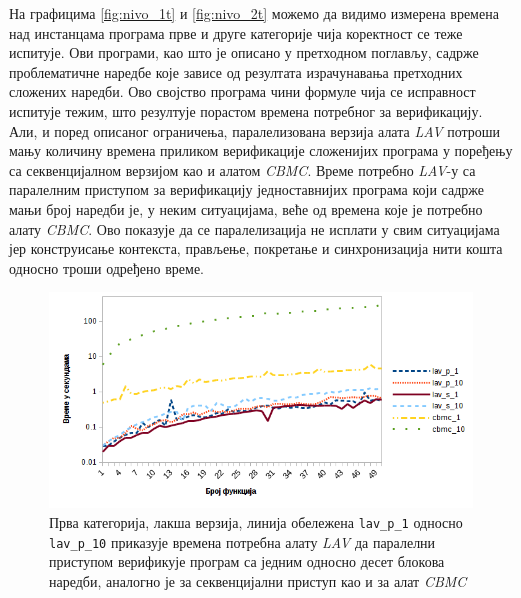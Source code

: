 \documentclass[12pt,oneside]{memoir}
\begin{document}
  На графицима \ref{fig:nivo_1t} и \ref{fig:nivo_2t} можемо да видимо измерена времена над инстанцама програма прве и друге категорије чија коректност се теже испитује. Ови програми, као што је описано у претходном поглављу, садрже проблематичне наредбе које зависе од резултата израчунавања претходних сложених наредби. Ово својство програма чини формуле чија се исправност испитује тежим, што резултује порастом времена потребног за верификацију. Али, и поред описаног ограничења, паралелизована верзија алата \textit{LAV} потроши мању количину времена приликом верификације сложенијих програма у поређењу са секвенцијалном верзијом као и алатом \textit{CBMC}. Време потребно \textit{LAV}-у са паралелним приступом за верификацију једноставнијих програма који садрже мањи број наредби је, у неким ситуацијама, веће од времена које је потребно алату \textit{CBMC}. Ово показује да се паралелизација не исплати у свим ситуацијама јер конструисање контекста, прављење, покретање и синхронизација нити кошта односно троши одређено време.  
  
\newpage
\begin{figure}[!ht]
  \centering
  \includegraphics[scale=0.8]{img/nivo1_master.png}
  \caption{Прва категорија, лакша верзија, линија обележена \texttt{lav\_p\_1} односно \texttt{lav\_p\_10} приказује времена потребна алату \textit{LAV} да паралелни приступом верификује програм са једним односно десет блокова наредби, аналогно је за секвенцијални приступ као и за алат \textit{CBMC}}
  \label{fig:nivo_1}
\end{figure}
\end{document}
